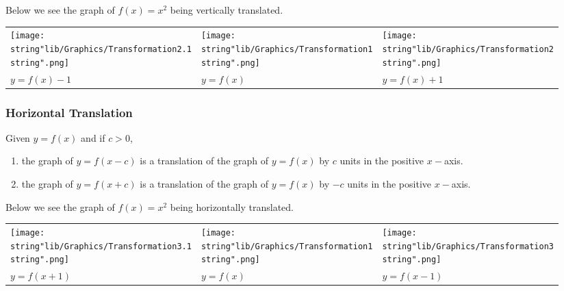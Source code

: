 \documentclass[11pt,a4paper]{book}
\begin{document}
Below we see the graph of $f\left(x\right)=x^{2}$ being vertically
translated.
\begin{center}
\begin{tabular}{>{\centering}p{5.2cm}>{\centering}p{5.2cm}>{\centering}p{5.2cm}}
\centering{}\texttt{[image: \\string"lib/Graphics/Transformation2.1\\string".png]} & \centering{}\texttt{[image: \\string"lib/Graphics/Transformation1\\string".png]} & \centering{}\texttt{[image: \\string"lib/Graphics/Transformation2\\string".png]}\tabularnewline
\centering{}$y=f\left(x\right)-1$ & \centering{}$y=f\left(x\right)$ & \centering{}$y=f\left(x\right)+1$\tabularnewline
\end{tabular}
\par\end{center}

\subsubsection{Horizontal Translation}

\begin{tcolorbox}[colback=blue!5, colframe=black,boxrule=.4pt, sharpish corners]

Given $y=f\left(x\right)$ and if $c>0$,

\begin{enumerate}[label=(\alph*)]

\item  the graph of $y=f\left(x-c\right)$ is a translation of the
graph of $y=f\left(x\right)$ by $c$ units in the positive $x-$axis.

\item  the graph of $y=f\left(x+c\right)$ is a translation of the
graph of $y=f\left(x\right)$ by $-c$ units in the positive $x-$axis.

\end{enumerate}
\end{tcolorbox}

Below we see the graph of $f\left(x\right)=x^{2}$ being horizontally
translated.
\begin{center}
\begin{tabular}{>{\centering}p{5.2cm}>{\centering}p{5.2cm}>{\centering}p{5.2cm}}
\centering{}\texttt{[image: \\string"lib/Graphics/Transformation3.1\\string".png]} & \centering{}\texttt{[image: \\string"lib/Graphics/Transformation1\\string".png]} & \centering{}\texttt{[image: \\string"lib/Graphics/Transformation3\\string".png]}\tabularnewline
\centering{}$y=f\left(x+1\right)$ & \centering{}$y=f\left(x\right)$ & \centering{}$y=f\left(x-1\right)$\tabularnewline
\end{tabular}
\par\end{center}
\end{document}

